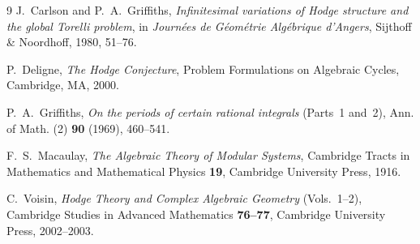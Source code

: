 \documentclass[11pt,a4paper]{article}
\begin{document}
\begin{thebibliography}{9}
J.~Carlson and P.~A.~Griffiths, \emph{Infinitesimal variations of Hodge structure and the global Torelli problem}, in \emph{Journ\'ees de G\'eom\'etrie Alg\'ebrique d'Angers}, Sijthoff \& Noordhoff, 1980, 51--76.

P.~Deligne, \emph{The Hodge Conjecture}, Problem Formulations on Algebraic Cycles, Cambridge, MA, 2000.

P.~A.~Griffiths, \emph{On the periods of certain rational integrals} (Parts~1 and~2), Ann. of Math. (2) \textbf{90} (1969), 460--541.

F.~S.~Macaulay, \emph{The Algebraic Theory of Modular Systems}, Cambridge Tracts in Mathematics and Mathematical Physics \textbf{19}, Cambridge University Press, 1916.

C.~Voisin, \emph{Hodge Theory and Complex Algebraic Geometry} (Vols.~1--2), Cambridge Studies in Advanced Mathematics \textbf{76--77}, Cambridge University Press, 2002--2003.
\end{thebibliography}
\end{document}
